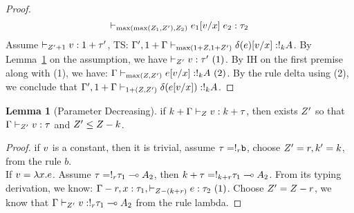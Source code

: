 \documentclass[a4paper,11pt]{article}
\theoremstyle{definition}
\newtheorem{lem}[thm]{Lemma}
\begin{document}
\begin{proof}
$$      \vdash_{\max( \max(Z_1,Z'),Z_2) }
      e_1[v/x] \; e_2 : \tau_2$$
  Assume $\empty \tvdash{\nnatA'+1} \valr : 1+\type' $, TS: $ \Gamma'
  ,1+\Gamma \vdash_{\max(1+Z, 1+Z')} \delta(e)
  [v/x]: !_{k} A $.
  By Lemma~\ref{para-dec} on the assumption, we have $\empty
  \tvdash{\nnatA'} \valr : \type'~(1) $. By IH on the first premise
  along with (1), we have: $\Gamma \vdash_{\max(Z, Z')}
  e[v/x]: !_{k} A~ (2)$.
  By the rule delta using (2), we conclude that $\Gamma' ,1+\Gamma  \vdash_{1+(Z,Z')} \delta(e[v/x]): !_{k} A$.
\end{proof}

\begin{lem}[Parameter Decreasing]
  \label{para-dec}
  if  $k+\Gamma \vdash_{Z} v : k+ \tau  $, then exists 
  $Z'$ so
  that   $\Gamma \vdash_{Z' } v :
  \tau$ and  $Z' \leq Z-k $.
\end{lem}
\begin{proof}
  if $v$ is a constant, then it is trivial, assume $\tau =
  !_{r} \mathtt{b}$, choose
  $Z' = r, k'=k$, from the rule $b$.  \\
  If $v = \lambda
  x. e$. Assume $\tau = !_{r} \tau_1 \multimap A_2 $, then $k+\tau =
  !_{k+r} \tau_1 \multimap A_2 $. From its typing derivation, we know: $\Gamma-r, x: \tau_1, 
   \vdash_{Z - (k+r) } e: \tau_2 ~(1)$. Choose $Z' =
   Z -r$, we know that $\Gamma  \vdash_{Z' } v :
  !_{r} \tau_1 \multimap A_2$ from the rule lambda.
  \end{proof}
\end{document}
